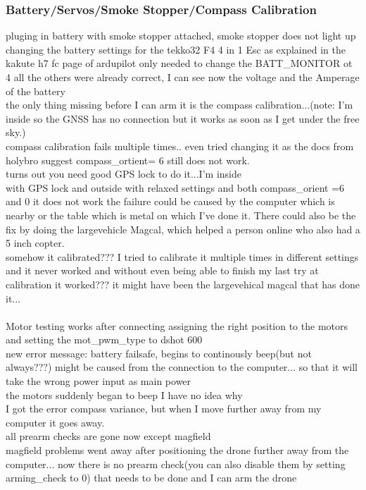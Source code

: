 \documentclass{article}
\begin{document}
	\subsubsection*{Battery/Servos/Smoke Stopper/Compass Calibration}
	pluging in battery with smoke stopper attached, smoke stopper does not light up
	\\changing the battery settings for the tekko32 F4 4 in 1 Esc as explained in the kakute h7 fc page of ardupilot only needed to change the BATT\_MONITOR ot 4 all the others were already correct, I can see now the voltage and the Amperage of the battery
	\\the only thing missing before I can arm it is the compass calibration...(note: I'm inside so the GNSS has no connection but it works as soon as I get under the free sky.)
	\\ compass calibration fails multiple times.. even tried changing it as the docs from holybro suggest compass\_ortient= 6 still does not work. 
	\\ turns out you need good GPS lock to do it...I'm inside
	\\with GPS lock and outside with relaxed settings and both compass\_orient =6 and 0 it does not work
	the failure could be caused by the computer which is nearby or the table which is metal on which I've done it. 
	There could also be the fix by doing the largevehicle Magcal, which helped a person online who also had a 5 inch copter. 
	\\ somehow it calibrated??? I tried to calibrate it multiple times in different settings and it never worked and without even being able to finish my last try at calibration it worked??? it might have been the largevehical magcal that has done it...
	\\
	\\ Motor testing works after connecting assigning the right position to the motors and setting the mot\_pwm\_type to dshot 600
	\\new error message: battery failsafe, begins to continously beep(but not always???) might be caused from the connection to the computer... so that it will take the wrong power input as main power
	\\ the motors suddenly began to beep I have no idea why
	\\ I got the error compass variance, but when I move further away from my computer it goes away.
	\\ all prearm checks are gone now except magfield
	\\ magfield problems went away after positioning the drone further away from the computer... now there is no prearm check(you can also disable them by setting arming\_check to 0) that needs to be done and I can arm the drone
\end{document}

